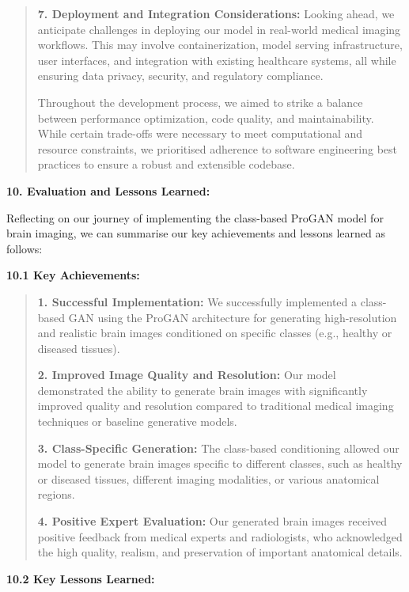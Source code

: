 \documentclass[
]{article}
\begin{document}
\begin{quote}
\textbf{7. Deployment and Integration Considerations:} Looking ahead, we
anticipate challenges in deploying our model in real-world medical
imaging workflows. This may involve containerization, model serving
infrastructure, user interfaces, and integration with existing
healthcare systems, all while ensuring data privacy, security, and
regulatory compliance.

Throughout the development process, we aimed to strike a balance between
performance optimization, code quality, and maintainability. While
certain trade-offs were necessary to meet computational and resource
constraints, we prioritised adherence to software engineering best
practices to ensure a robust and extensible codebase.
\end{quote}

\textbf{10. Evaluation and Lessons Learned:}

Reflecting on our journey of implementing the class-based ProGAN model
for brain imaging, we can summarise our key achievements and lessons
learned as follows:

\textbf{10.1 Key Achievements:}

\begin{quote}
\textbf{1. Successful Implementation:} We successfully implemented a
class-based GAN using the ProGAN architecture for generating
high-resolution and realistic brain images conditioned on specific
classes (e.g., healthy or diseased tissues).

\textbf{2. Improved Image Quality and Resolution:} Our model
demonstrated the ability to generate brain images with significantly
improved quality and resolution compared to traditional medical imaging
techniques or baseline generative models.

\textbf{3. Class-Specific Generation:} The class-based conditioning
allowed our model to generate brain images specific to different
classes, such as healthy or diseased tissues, different imaging
modalities, or various anatomical regions.

\textbf{4. Positive Expert Evaluation:} Our generated brain images
received positive feedback from medical experts and radiologists, who
acknowledged the high quality, realism, and preservation of important
anatomical details.

\end{quote}

\textbf{10.2 Key Lessons Learned:}
\end{document}
